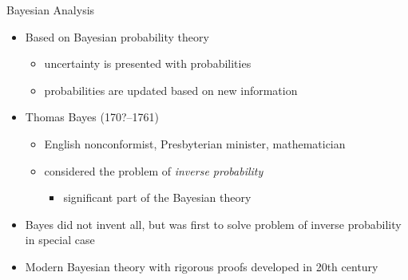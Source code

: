 \documentclass[10pt,handout]{beamer}
\begin{document}
\begin{frame}{Bayesian Analysis}

  \begin{itemize}
  \item Based on Bayesian probability theory
    \begin{itemize}
    \item uncertainty is presented with probabilities
    \item probabilities are updated based on new information
    \end{itemize}
    \pause
    \item Thomas Bayes (170?--1761)
    \begin{itemize}
    \item English nonconformist, Presbyterian minister,
      mathematician
    \item considered the problem of {\it inverse probability}
      \begin{itemize}
        \item significant part of the Bayesian theory
      \end{itemize}
  \end{itemize}
  \pause
  \item Bayes did not invent all, but was first to solve problem of
    inverse probability in special case
  \item Modern Bayesian theory with rigorous proofs developed in
    20th century
\end{itemize}
\end{frame}
\end{document}
